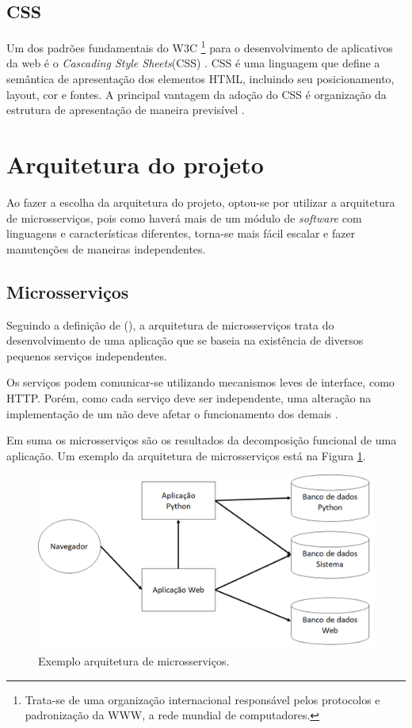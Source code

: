 
\subsection{CSS}
Um dos padrões fundamentais do W3C \footnote{Trata-se de uma organização internacional responsável pelos protocolos e padronização da WWW, a rede mundial de computadores.} para o desenvolvimento de aplicativos da web é o \textit{Cascading Style Sheets}(CSS) \cite{Casca8378199:online,css}.
%
CSS é uma linguagem que define a semântica de apresentação dos elementos HTML, incluindo seu posicionamento, layout, cor e fontes. A principal vantagem da adoção do CSS é organização da estrutura de apresentação de maneira previsível \cite{badros1999constraint}.



\section{Arquitetura do projeto}

Ao fazer a escolha da arquitetura do projeto, optou-se por utilizar a arquitetura de microsserviços, pois como haverá mais de um módulo de \textit{software} com linguagens e características diferentes, torna-se mais fácil escalar e fazer manutenções de maneiras independentes.

\subsection{Microsserviços}
Seguindo a definição de \citeauthor{ms1} (\citeyear{ms1}), a arquitetura de microsserviços trata do desenvolvimento de uma aplicação que se baseia na existência de diversos pequenos serviços independentes. 

Os serviços podem comunicar-se utilizando mecanismos leves de interface, como HTTP. Porém, como cada serviço deve ser independente, uma alteração na implementação de um não deve afetar o funcionamento dos demais \cite{Pahl}.

Em suma os microsserviços são os resultados da decomposição funcional de uma aplicação. 
%
Um exemplo da arquitetura de microsserviços está na Figura \ref{fig:arquitetura-microsservicos}.

\begin{figure}[H]
	\centering
	\includegraphics[width=1\linewidth]{figuras/WebService/microservices.png}
	\caption{Exemplo arquitetura de microsserviços.}
	\label{fig:arquitetura-microsservicos}
\end{figure}

 






